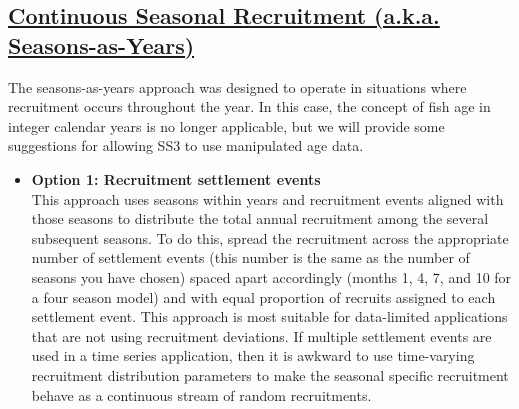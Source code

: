 \subsection[Continuous Seasonal Recruitment (a.k.a. Seasons-as-Years)]{\protect\hyperlink{continuous-seasonal-recruitment-sec}{Continuous Seasonal Recruitment (a.k.a. Seasons-as-Years)}}
The seasons-as-years approach was designed to operate in situations where recruitment occurs throughout the year. In this case, the concept of fish age in integer calendar years is no longer applicable, but we will provide some suggestions for allowing SS3 to use manipulated age data.
\begin{itemize}
	\item \textbf{Option 1: Recruitment settlement events} \\
	This approach uses seasons within years and recruitment events aligned with those seasons to distribute the total annual recruitment among the several subsequent seasons. To do this, spread the recruitment across the appropriate number of settlement events (this number is the same as the number of seasons you have chosen) spaced apart accordingly (months 1, 4, 7, and 10 for a four season model) and with equal proportion of recruits assigned to each settlement event. This approach is most suitable for data-limited applications that are not using recruitment deviations. If multiple settlement events are used in a time series application, then it is awkward to use time-varying recruitment distribution parameters to make the seasonal specific recruitment behave as a continuous stream of random recruitments.
\end{itemize}

